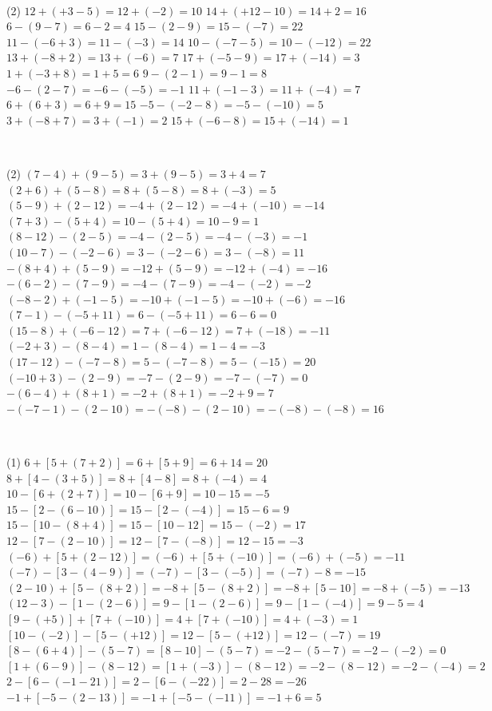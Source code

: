 \documentclass[11pt,a4paper]{article}
\newcommand{\estrelles}[1]{{\color{accent}\ifcase#1\or\faStar\faStar[regular]\faStar[regular]\or\faStar\faStar\faStar[regular]\or\faStar\faStar\faStar\fi}}
\newcounter{exer}
\newcommand{\ex}[1]{\par\needspace{4\baselineskip}\medskip\stepcounter{exer}\noindent{\color{navy}\bfseries\theexer.}\ \ {\small\estrelles{#1}}\ \ }
\newcommand{\res}[1]{\boxed{#1}}
\begin{document}
\ex{2} \begin{tasks}(2)
  \task $12+(+3-5)=12+(-2)=\res{10}$
  \task $14+(+12-10)=14+2=\res{16}$
  \task $6-(9-7)=6-2=\res{4}$
  \task $15-(2-9)=15-(-7)=\res{22}$
  \task $11-(-6+3)=11-(-3)=\res{14}$
  \task $10-(-7-5)=10-(-12)=\res{22}$
  \task $13+(-8+2)=13+(-6)=\res{7}$
  \task $17+(-5-9)=17+(-14)=\res{3}$
  \task $1+(-3+8)=1+5=\res{6}$
  \task $9-(2-1)=9-1=\res{8}$
  \task $-6-(2-7)=-6-(-5)=\res{-1}$
  \task $11+(-1-3)=11+(-4)=\res{7}$
  \task $6+(6+3)=6+9=\res{15}$
  \task $-5-(-2-8)=-5-(-10)=\res{5}$
  \task $3+(-8+7)=3+(-1)=\res{2}$
  \task $15+(-6-8)=15+(-14)=\res{1}$
\end{tasks}

\ex{2} \begin{tasks}(2)
  \task $(7-4)+(9-5)=3+(9-5)=3+4=\res{7}$
  \task $(2+6)+(5-8)=8+(5-8)=8+(-3)=\res{5}$
  \task $(5-9)+(2-12)=-4+(2-12)=-4+(-10)=\res{-14}$
  \task $(7+3)-(5+4)=10-(5+4)=10-9=\res{1}$
  \task $(8-12)-(2-5)=-4-(2-5)=-4-(-3)=\res{-1}$
  \task $(10-7)-(-2-6)=3-(-2-6)=3-(-8)=\res{11}$
  \task $-(8+4)+(5-9)=-12+(5-9)=-12+(-4)=\res{-16}$
  \task $-(6-2)-(7-9)=-4-(7-9)=-4-(-2)=\res{-2}$
  \task $(-8-2)+(-1-5)=-10+(-1-5)=-10+(-6)=\res{-16}$
  \task $(7-1)-(-5+11)=6-(-5+11)=6-6=\res{0}$
  \task $(15-8)+(-6-12)=7+(-6-12)=7+(-18)=\res{-11}$
  \task $(-2+3)-(8-4)=1-(8-4)=1-4=\res{-3}$
  \task $(17-12)-(-7-8)=5-(-7-8)=5-(-15)=\res{20}$
  \task $(-10+3)-(2-9)=-7-(2-9)=-7-(-7)=\res{0}$
  \task $-(6-4)+(8+1)=-2+(8+1)=-2+9=\res{7}$
  \task $-(-7-1)-(2-10)=-(-8)-(2-10)=-(-8)-(-8)=\res{16}$
\end{tasks}

\ex{3} \begin{tasks}(1)
  \task $6+[5+(7+2)]=6+[5+9]=6+14=\res{20}$
  \task $8+[4-(3+5)]=8+[4-8]=8+(-4)=\res{4}$
  \task $10-[6+(2+7)]=10-[6+9]=10-15=\res{-5}$
  \task $15-[2-(6-10)]=15-[2-(-4)]=15-6=\res{9}$
  \task $15-[10-(8+4)]=15-[10-12]=15-(-2)=\res{17}$
  \task $12-[7-(2-10)]=12-[7-(-8)]=12-15=\res{-3}$
  \task $(-6)+[5+(2-12)]=(-6)+[5+(-10)]=(-6)+(-5)=\res{-11}$
  \task $(-7)-[3-(4-9)]=(-7)-[3-(-5)]=(-7)-8=\res{-15}$
  \task $(2-10)+[5-(8+2)]=-8+[5-(8+2)]=-8+[5-10]=-8+(-5)=\res{-13}$
  \task $(12-3)-[1-(2-6)]=9-[1-(2-6)]=9-[1-(-4)]=9-5=\res{4}$
  \task $[9-(+5)]+[7+(-10)]=4+[7+(-10)]=4+(-3)=\res{1}$
  \task $[10-(-2)]-[5-(+12)]=12-[5-(+12)]=12-(-7)=\res{19}$
  \task $[8-(6+4)]-(5-7)=[8-10]-(5-7)=-2-(5-7)=-2-(-2)=\res{0}$
  \task $[1+(6-9)]-(8-12)=[1+(-3)]-(8-12)=-2-(8-12)=-2-(-4)=\res{2}$
  \task $2-[6-(-1-21)]=2-[6-(-22)]=2-28=\res{-26}$
  \task $-1+[-5-(2-13)]=-1+[-5-(-11)]=-1+6=\res{5}$
\end{tasks}
\end{document}
